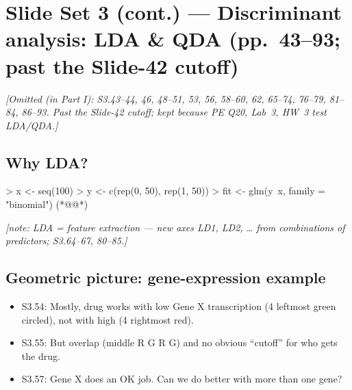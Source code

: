 \section{Slide Set 3 (cont.) --- Discriminant analysis: LDA \& QDA (pp.~43--93; past the Slide-42 cutoff)}
{\color{figgray}\itshape [Omitted (in Part I): S3.43--44, 46, 48--51, 53, 56, 58--60, 62, 65--74, 76--79, 81--84, 86--93.
Past the Slide-42 cutoff; kept because PE Q20, Lab~3, HW~3 test LDA/QDA.]}

\subsection{Why LDA?}

\begin{routput}
> x <- seq(100)
> y <- c(rep(0, 50), rep(1, 50))
> fit <- glm(y~x, family = "binomial")        (*@@*)
\end{routput}

{\color{figgray}\itshape [note: LDA = feature extraction --- new axes LD1, LD2, \ldots{} from combinations of predictors; S3.64--67, 80--85.]}

\subsection{Geometric picture: gene-expression example}

\begin{itemize}
\item S3.54: Mostly, drug works with low Gene X transcription (4 leftmost green circled), not with high (4 rightmost red).
\item S3.55: But overlap (middle R G R G) and no obvious ``cutoff'' for who gets the drug.
\item S3.57: Gene X does an OK job. Can we do better with more than one gene?
\end{itemize}

